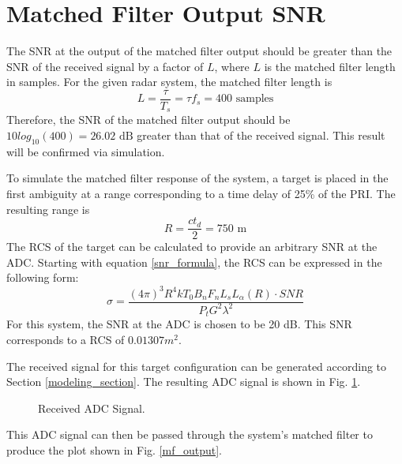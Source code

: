 \documentclass[conference]{IEEEtran}
\begin{document}
\section{Matched Filter Output SNR}
\label{mf_snr_section}
The SNR at the output of the matched filter output should be greater than the SNR of the received signal by a factor of $L$, where $L$ is the matched filter length in samples. For the given radar system, the matched filter length is
\begin{equation}
L = \frac{\tau}{T_s} = \tau f_s = 400 \text{ samples}
\end{equation}
Therefore, the SNR of the matched filter output should be $10log_{10}(400)=26.02 \text{ dB}$ greater than that of the received signal. This result will be confirmed via simulation.
\par
To simulate the matched filter response of the system, a target is placed in the first ambiguity at a range corresponding to a time delay of 25\% of the PRI. The resulting range is
\begin{equation}
R = \frac{ct_d}{2} = 750 \text{ m}
\label{tgt1 range}
\end{equation}
The RCS of the target can be calculated to provide an arbitrary SNR at the ADC. Starting with equation \eqref{snr_formula}, the RCS can be expressed in the following form:
\begin{equation}
\sigma = \frac{(4\pi)^3 R^4 k T_0 B_n F_n L_s L_\alpha(R)\cdot SNR}{P_t G^2 \lambda^2}
\label{rcs_formula}
\end{equation}
For this system, the SNR at the ADC is chosen to be 20 dB. This SNR corresponds to a RCS of $0.01307m^2$.
\par
The received signal for this target configuration can be generated according to Section \ref{modeling_section}. The resulting ADC signal is shown in Fig. \ref{adc_sig}.
\begin{figure}[H]
\centerline{}
\caption{Received ADC Signal.}
\label{adc_sig}
\end{figure}
\noindent
This ADC signal can then be passed through the system's matched filter to produce the plot shown in Fig. \ref{mf_output}.
\end{document}
